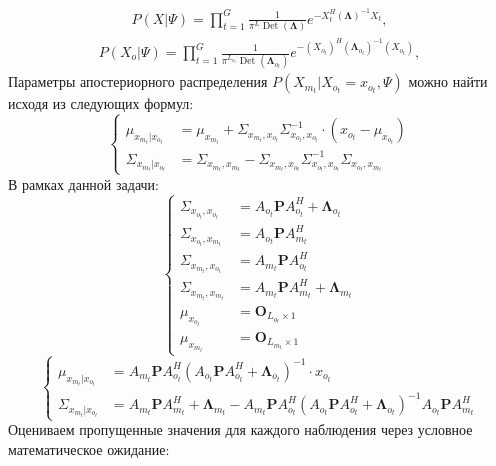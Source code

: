 \documentclass[11pt]{article}
\DeclareMathOperator{\Det}{Det}
\begin{document}
\begin{gather}
P(X|\Psi) = \prod_{t=1}^G \frac{1}{\pi^L \Det(\mathbf{\Lambda})}e^{-X_t^H (\mathbf{\Lambda})^{-1}X_t},
\end{gather}
\begin{gather}
P(X_o|\Psi) = \prod_{t=1}^G \frac{1}{\pi^{L_{o_t}} \Det(\mathbf{\Lambda}_{o_t})}e^{-(X_{o_t})^H (\mathbf{\Lambda}_{o_t})^{-1}(X_{o_t})},
\end{gather}
Параметры апостериорного распределения $P(X_{m_t}|X_{o_t}=x_{o_t},\Psi)$ можно найти исходя из следующих формул:
\begin{equation}
\left\{ \begin{aligned} 
\mu_{x_{m_t}|x_{o_t}} &= \mu_{x_{m_t}} + \Sigma_{x_{m_t},x_{o_t}}\Sigma_{x_{o_t},x_{o_t}}^{-1}\cdot(x_{o_t}-\mu_{x_{o_t}}) \\
\Sigma_{x_{m_t}|x_{o_t}} &= \Sigma_{x_{m_t},x_{m_t}}-\Sigma_{x_{m_t},x_{o_t}}\Sigma_{x_{o_t},x_{o_t}}^{-1}\Sigma_{x_{o_t},x_{m_t}}
\end{aligned} \right.
\end{equation}
В рамках данной задачи:
\begin{equation}
\left\{ \begin{aligned} 
\Sigma_{x_{o_t},x_{o_t}} &= A_{o_t}\mathbf{P} A_{o_t}^H +\mathbf{\Lambda}_{o_t} \\
\Sigma_{x_{o_t},x_{m_t}} &= A_{o_t}\mathbf{P} A_{m_t}^H \\
\Sigma_{x_{m_t},x_{o_t}} &= A_{m_t}\mathbf{P} A_{o_t}^H \\
\Sigma_{x_{m_t},x_{m_t}} &= A_{m_t}\mathbf{P} A_{m_t}^H + \mathbf{\Lambda}_{m_t} \\
\mu_{x_{o_t}}&=\mathbf{O}_{L_{o_t} \times 1} \\
\mu_{x_{m_t}}&=\mathbf{O}_{L_{m_t} \times 1}
\end{aligned} \right.
\end{equation}
\begin{equation}
\left\{ 
\begin{aligned}
 \mu_{x_{m_t}|x_{o_t}} &= A_{m_t}\mathbf{P} A_{o_t}^H(A_{o_t}\mathbf{P} A_{o_t}^H + \mathbf{\Lambda}_{o_t})^{-1}\cdot x_{o_t} \\
\Sigma_{x_{m_t}|x_{o_t}} &= A_{m_t}\mathbf{P} A_{m_t}^H + \mathbf{\Lambda}_{m_t}-A_{m_t}\mathbf{P} A_{o_t}^H(A_{o_t}\mathbf{P} A_{o_t}^H + \mathbf{\Lambda}_{o_t})^{-1}A_{o_t}\mathbf{P} A_{m_t}^H
\end{aligned}
\right.
\end{equation}
Оцениваем пропущенные значения для каждого наблюдения через условное математическое ожидание:
\end{document}
